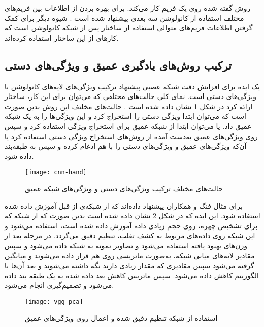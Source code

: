  روش گفته شده روی یک فریم کار می‌کند. برای بهره بردن از اطلاعات بین فریم‌های مختلف استفاده از کانولوشن سه بعدی پیشنهاد شده است 
\cite{gan20173d,li2018learning}
 . شیوه دیگر برای کمک گرفتن اطلاعات فریم‌های متوالی استفاده از ساختار
 \cite{hochreiter1997long}
  پس از شبکه کانولوشن است که کارهای
\cite{xu2015learning,yang2019face}
از این ساختار استفاده کرده‌اند.
 

\subsection{ترکیب روش‌های یادگیری عمیق و ویژگی‌های دستی}
یک ایده برای افزایش دقت شبکه عصبی پیشنهاد ترکیب ویژگی‌های لایه‌های کانولوشن با ویژگی‌های دستی
 است. نمای کلی حالت‌های مختلفی که می‌توان برای این کار، ساختار ارائه کرد در شکل 
\ref{fig:cnn-hand}
نشان داده شده است 
\cite{yu2021deep}.
 حالت‌های مخلتف این روش بدین صورت است که می‌توان ابتدا ویژگی دستی را استخراج کرد و این ویژگی‌ها را به یک شبکه عمیق داد. یا می‌توان ابتدا از شبکه عمیق برای استخراج ویژگی استفاده کرد و سپس روی ویژگی‌های عمیق به‌دست آمده از روش‌های استخراج ویژگی دستی استفاده کرد یا آن‌که ویژگی‌های عمیق و ویژگی‌های دستی را با هم ادغام کرده و سپس به طبقه‌بند داده شود.

\begin{figure}[hb]
	\centerline{\texttt{[image: cnn-hand]}}
	\caption{حالت‌های مختلف ترکیب ویژگی‌های دستی و ویژگی‌های شبکه عمیق \cite{yu2021deep}}
	\label{fig:cnn-hand}
\end{figure}

برای مثال فنگ و همکاران 
\cite{li2016original} 
پیشنهاد داده‌اند که از شبکه‌ی از قبل آموزش داده شده استفاده شود. 
این ایده که در شکل 
\ref{fig:vgg-pca}
 نشان داده شده است
بدین صورت که از شبکه
  \cite{parkhi2015deep}
 که برای تشخیص چهره، روی حجم زیادی داده آموزش داده شده است، استفاده می‌شود و این شبکه روی داده‌های مربوط به کشف تقلب، تنظیم دقیق
  می‌گردد. در مرحله بعد از وزن‌های بهبود یافته استفاده می‌شود و تصاویر نمونه به شبکه داده می‌شود و سپس مقادیر لایه‌های میانی شبکه، به‌صورت ماتریسی روی هم قرار داده می‌شوند و میانگین گرفته می‌شود سپس مقادیری که مقدار زیادی دارند نگه داشته می‌شوند و بعد آن‌ها با الگوریتم  کاهش داده می‌شود. سپس ماتریس کاهش بعد داده شده به یک طبقه بند  داده می‌شود و تصمیم‌گیری انجام می‌شود. 
\begin{figure}[h]
	\centerline{\texttt{[image: vgg-pca]}}
	\caption{استفاده از شبکه تنظیم دقیق شده و اعمال
		روی ویژگی‌های عمیق
		\cite{li2016original}}
	\label{fig:vgg-pca}
\end{figure}

